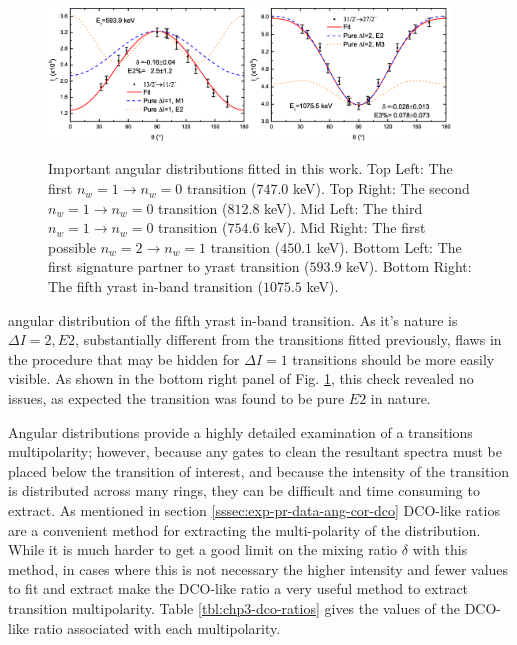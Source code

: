 \begin{figure}[t!]
\centerline{\includegraphics[width=0.475\textwidth]{./img/c4/594Dist_Plot.eps}\hspace{0.04\textwidth}\includegraphics[width=0.475\textwidth]{./img/c4/1075Dist_Plot.eps}}
	\caption{Important angular distributions fitted in this work. Top Left: The first $n_w=1\rightarrow{}n_w=0$ transition ($747.0$ keV). Top Right: The second $n_w=1\rightarrow{}n_w=0$ transition ($812.8$ keV). Mid Left: The third $n_w=1\rightarrow{}n_w=0$ transition ($754.6$ keV). Mid Right: The first possible $n_w=2\rightarrow{}n_w=1$ transition ($450.1$ keV).  Bottom Left: The first signature partner to yrast transition ($593.9$ keV). Bottom Right: The fifth yrast in-band transition ($1075.5$ keV).\label{fig:chp4-angular-distributions}}
\end{figure}
angular distribution of the fifth yrast in-band transition. As it's nature is $\Delta{}I=2, E2$, substantially different from the transitions fitted previously, flaws in the procedure that may be hidden for $\Delta{}I=1$ transitions should be more easily visible. As shown in the bottom right panel of Fig. \ref{fig:chp4-angular-distributions}, this check revealed no issues, as expected the transition was found to be pure $E2$ in nature.
 
Angular distributions provide a highly detailed examination of a transitions multipolarity; however, because any gates to clean the resultant spectra must be placed below the transition of interest, and because the intensity of the transition is distributed across many rings, they can be difficult and time consuming to extract. As mentioned in section \ref{sssec:exp-pr-data-ang-cor-dco} DCO-like ratios are a convenient method for extracting the multi-polarity of the distribution. While it is much harder to get a good limit on the mixing ratio $\delta$ with this method, in cases where this is not necessary the higher intensity and fewer values to fit and extract make the DCO-like ratio a very useful method to extract transition multipolarity. Table \ref{tbl:chp3-dco-ratios} gives the values of the DCO-like ratio associated with each multipolarity. 

